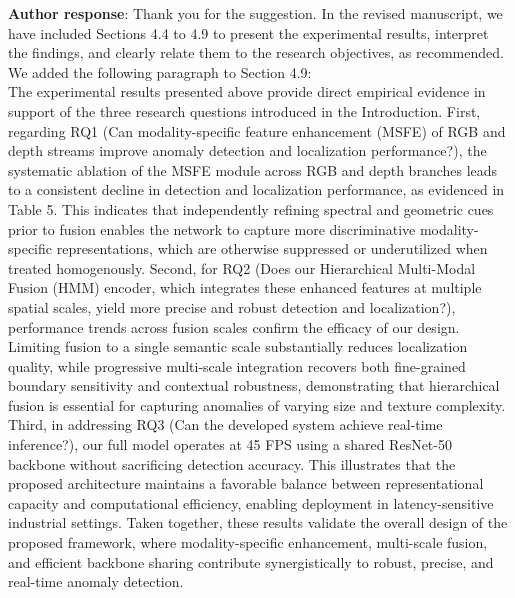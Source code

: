 \documentclass[a4paper,fleqnn]{cas-sc}
\begin{document}
\noindent \textbf{Author response}: Thank you for the suggestion. In the revised manuscript, we have included Sections 4.4 to 4.9 to present the experimental results, interpret the findings, and clearly relate them to the research objectives, as recommended. \\

We added the following paragraph to Section 4.9: \\

The experimental results presented above provide direct empirical evidence in support of the three research questions introduced in the Introduction. First, regarding RQ1 (Can modality-specific feature enhancement (MSFE) of RGB and depth streams improve anomaly detection and localization performance?), the systematic ablation of the MSFE module across RGB and depth branches leads to a consistent decline in detection and localization performance, as evidenced in Table 5. This indicates that independently refining spectral and geometric cues prior to fusion enables the network to capture more discriminative modality-specific representations, which are otherwise suppressed or underutilized when treated homogenously. Second, for RQ2 (Does our Hierarchical Multi-Modal Fusion (HMM) encoder, which integrates these enhanced features at multiple spatial scales, yield more precise and robust detection and localization?), performance trends across fusion scales confirm the efficacy of our design. Limiting fusion to a single semantic scale substantially reduces localization quality, while progressive multi-scale integration recovers both fine-grained boundary sensitivity and contextual robustness, demonstrating that hierarchical fusion is essential for capturing anomalies of varying size and texture complexity. Third, in addressing RQ3 (Can the developed system achieve real-time inference?), our full model operates at 45 FPS using a shared ResNet-50 backbone without sacrificing detection accuracy. This illustrates that the proposed architecture maintains a favorable balance between representational capacity and computational efficiency, enabling deployment in latency-sensitive industrial settings. Taken together, these results validate the overall design of the proposed framework, where modality-specific enhancement, multi-scale fusion, and efficient backbone sharing contribute synergistically to robust, precise, and real-time anomaly detection.
\end{document}
